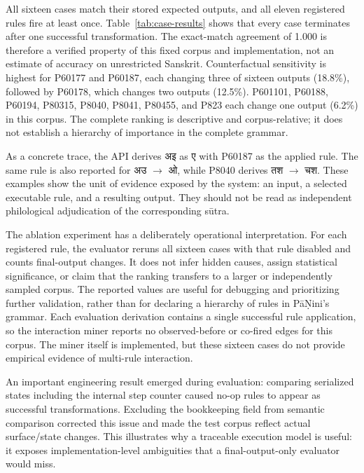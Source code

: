 \documentclass[conference]{IEEEtran}
\newcommand{\skt}[1]{{\devanagarifont #1}}
\begin{document}
All sixteen cases match their stored expected outputs, and all eleven registered rules fire at least once. Table~\ref{tab:case-results} shows that every case terminates after one successful transformation. The exact-match agreement of 1.000 is therefore a verified property of this fixed corpus and implementation, not an estimate of accuracy on unrestricted Sanskrit. Counterfactual sensitivity is highest for P60177 and P60187, each changing three of sixteen outputs (18.8\%), followed by P60178, which changes two outputs (12.5\%). P601101, P60188, P60194, P80315, P8040, P8041, P80455, and P823 each change one output (6.2\%) in this corpus. The complete ranking is descriptive and corpus-relative; it does not establish a hierarchy of importance in the complete grammar.

As a concrete trace, the API derives \skt{अइ} as \skt{ए} with P60187 as the applied rule. The same rule is also reported for \skt{अउ} $\rightarrow$ \skt{ओ}, while P8040 derives \skt{तश} $\rightarrow$ \skt{चश}. These examples show the unit of evidence exposed by the system: an input, a selected executable rule, and a resulting output. They should not be read as independent philological adjudication of the corresponding s\=utra.

The ablation experiment has a deliberately operational interpretation. For each registered rule, the evaluator reruns all sixteen cases with that rule disabled and counts final-output changes. It does not infer hidden causes, assign statistical significance, or claim that the ranking transfers to a larger or independently sampled corpus. The reported values are useful for debugging and prioritizing further validation, rather than for declaring a hierarchy of rules in P\={a}\d{N}ini's grammar. Each evaluation derivation contains a single successful rule application, so the interaction miner reports no observed-before or co-fired edges for this corpus. The miner itself is implemented, but these sixteen cases do not provide empirical evidence of multi-rule interaction.

An important engineering result emerged during evaluation: comparing serialized states including the internal step counter caused no-op rules to appear as successful transformations. Excluding the bookkeeping field from semantic comparison corrected this issue and made the test corpus reflect actual surface/state changes. This illustrates why a traceable execution model is useful: it exposes implementation-level ambiguities that a final-output-only evaluator would miss.
\end{document}
